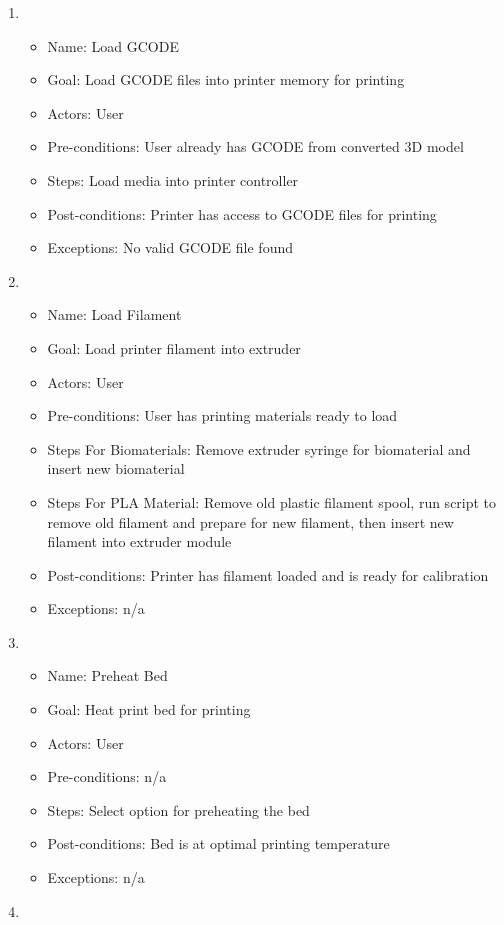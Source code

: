 \begin{enumerate}
	\item 
	\begin{itemize}
	\item Name: Load GCODE
	\item Goal: Load GCODE files into printer memory for printing
	\item Actors: User
	\item Pre-conditions: User already has GCODE from converted 3D model
	\item Steps: Load media into printer controller
	\item Post-conditions: Printer has access to GCODE files for printing
	\item Exceptions: No valid GCODE file found
	\end{itemize}
	\item 
	\begin{itemize}
	\item Name: Load Filament
	\item Goal: Load printer filament into extruder
	\item Actors: User
	\item Pre-conditions: User has printing materials ready to load
	\item Steps For Biomaterials: Remove extruder syringe for biomaterial and insert new biomaterial 
	\item Steps For PLA Material: Remove old plastic filament spool,
	run script to remove old filament and prepare for new filament, then
	insert new filament into extruder module
	\item Post-conditions: Printer has filament loaded and is ready for calibration
	\item Exceptions: n/a
	\end{itemize}
	\item 
	\begin{itemize}
	\item Name: Preheat Bed
	\item Goal: Heat print bed for printing 
	\item Actors: User
	\item Pre-conditions: n/a
	\item Steps: Select option for preheating the bed
	\item Post-conditions: Bed is at optimal printing temperature
	\item Exceptions: n/a
	\end{itemize}
	\item 

\end{enumerate}
